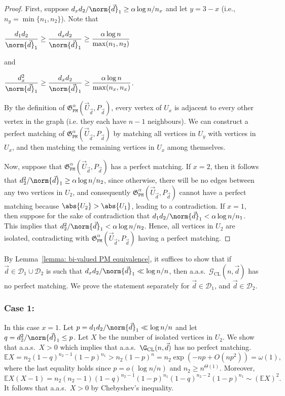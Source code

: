 \documentclass[12pt]{article}
\def\ex{{\mathbb E}}
\begin{document}
\begin{proof}
First, suppose $d_x d_2/\norm{\vec{d}}_1\geq\alpha\log n/n_x$ and let $y = 3-x$ (i.e., $n_y = \min\{n_1, n_2\}$). Note that
\begin{center}
    $\displaystyle\frac{d_1 d_2}{\norm{\vec{d}}_1}\geq\frac{d_x d_2}{\norm{\vec{d}}_1}\geq\frac{\alpha\log n}{\max(n_1, n_2)}$
\end{center}
and 
\begin{center}
    $\displaystyle\frac{d_x^2}{\norm{\vec{d}}_1}\geq\frac{d_x d_2}{\norm{\vec{d}}_1}\geq\frac{\alpha\log n}{\max(n_x, n_x)}$. 
\end{center}
By the definition of $\mathfrak{G}_{\texttt{PM}}^{\alpha}\left(\vec{U}_{\vec{d}}, P_{\vec{d}}\right)$, every vertex of $U_x$ is adjacent to every other vertex in the graph (i.e. they each have $n-1$ neighbours). We can construct a perfect matching of $\mathfrak{G}_{\texttt{PM}}^{\alpha}\left(\vec{U}_{\vec{d}}, P_{\vec{d}}\right)$ by matching all vertices in $U_y$ with vertices in $U_x$, and then matching the remaining vertices in $U_x$ among themselves.

Now, suppose that $\mathfrak{G}_{\texttt{PM}}^{\alpha}\left(\vec{U}_{\vec{d}}, P_{\vec{d}}\right)$ has a perfect matching. If $x = 2$, then it follows that $d_2^2/\norm{\vec{d}}_1\geq\alpha\log n/n_2$, since otherwise, there will be no edges between any two vertices in $U_2$, and consequently $\mathfrak{G}_{\texttt{PM}}^{\alpha}\left(\vec{U}_{\vec{d}}, P_{\vec{d}}\right)$ cannot have a perfect matching because $\abs{U_2}>\abs{U_1}$, leading to a contradiction. If $x = 1$, then suppose for the sake of contradiction that $d_1d_2/\norm{\vec{d}}_1 < \alpha\log n/n_1$. This implies that $d_2^2/\norm{\vec{d}}_1 < \alpha\log n/n_2$.  Hence, all vertices in $U_2$ are isolated, contradicting with $\mathfrak{G}_{\texttt{PM}}^{\alpha}\left(\vec{U}_{\vec{d}}, P_{\vec{d}}\right)$ having a perfect matching. 
\end{proof}

By Lemma~\ref{lemma: bi-valued PM equivalence}, it suffices to show that if $\vec{d}\in\mathcal{D}_1\cup\mathcal{D}_2$ is such that $d_x d_2/\norm{\vec{d}}_1\ll\log n/n$, then a.a.s.\ $\mathcal{G}_{\text{CL}}(n,\vec{d})$ has no perfect matching. We prove the statement separately for $\vec{d}\in\mathcal{D}_1$, and $\vec{d}\in\mathcal{D}_2$. 

\subsubsection{Case 1: }
In this case $x=1$.
Let $p = d_1 d_2/\norm{\vec{d}}_1\ll\log n/n$ and let $q = d_2^2/\norm{\vec{d}}_1\leq p$. Let $X$ be the number of isolated vertices in $U_2$. We show that a.a.s.\ $X>0$ which implies that a.a.s.\ $\G_{\text{CL}}(n,\vec{d})$ has no perfect matching.
\[
\ex{X}= n_2 \left(1-q\right)^{n_2-1}\left(1-p\right)^{n_1} > n_2\left(1-p\right)^n = n_2\exp(-np+O(np^2))=\omega(1), 
\]
where the last equality holds since $p = o(\log n/n)$ and $n_2\ge n^{\Theta(1)}$. Moreover,
\[
\ex{ X(X-1)}= n_2\left(n_2 - 1\right) \left(1-q\right)^{n_2 - 1}\left(1-p\right)^{n_1} \left(1-q\right)^{n_2 - 2}\left(1-p\right)^{n_1}\sim (\ex X)^2.
\]
It follows that a.a.s.\ $X>0$ by Chebyshev's inequality.
\end{document}
